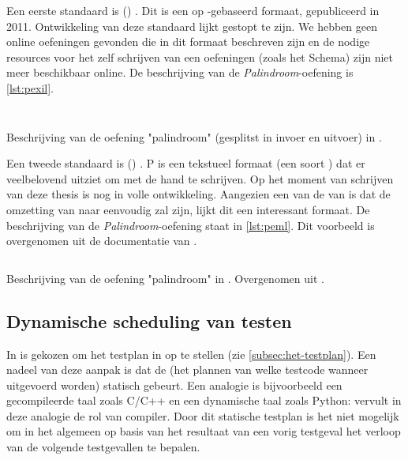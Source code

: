 Een eerste standaard is  () \autocite{queiros2011pexil}.
Dit is een op -gebaseerd formaat, gepubliceerd in 2011.
Ontwikkeling van deze standaard lijkt gestopt te zijn.
We hebben geen online oefeningen gevonden die in dit formaat beschreven zijn en de nodige resources voor het zelf schrijven van een oefeningen (zoals het  Schema) zijn niet meer beschikbaar online.
De beschrijving van de \emph{Palindroom}-oefening is \cref{lst:pexil}.

\begin{listing}
    \inputminted{xml}{code/pexil-in.xml}
    \inputminted{xml}{code/pexil-out.xml}
    \caption{Beschrijving van de oefening "palindroom" (gesplitst in invoer en uitvoer) in .}
    \label{lst:pexil}
\end{listing}

Een tweede standaard is  () \autocite{peml}.
P is een tekstueel formaat (een soort ) dat er veelbelovend uitziet om met de hand te schrijven.
Op het moment van schrijven van deze thesis is  nog in volle ontwikkeling.
Aangezien een van de  van  is dat de omzetting van  naar  eenvoudig zal zijn, lijkt dit een interessant formaat.
De beschrijving van de \emph{Palindroom}-oefening staat in \cref{lst:peml}.
Dit voorbeeld is overgenomen uit de documentatie van .

\begin{listing}
    \inputminted{yaml}{code/peml.peml}
    \caption{
        Beschrijving van de oefening "palindroom" in .
        Overgenomen uit \autocite{peml}.
    }
    \label{lst:peml}
\end{listing}


\subsection{Dynamische scheduling van testen}\label{subsec:dynamische-scheduling-van-testen}

In \tested{} is gekozen om het testplan in  op te stellen (zie \cref{subsec:het-testplan}).
Een nadeel van deze aanpak is dat de  (het plannen van welke testcode wanneer uitgevoerd worden) statisch gebeurt.
Een analogie is bijvoorbeeld een gecompileerde taal zoals C/C++ en een dynamische taal zoals Python: \tested{} vervult in deze analogie de rol van compiler.
Door dit statische testplan is het niet mogelijk om in het algemeen op basis van het resultaat van een vorig testgeval het verloop van de volgende testgevallen te bepalen.

